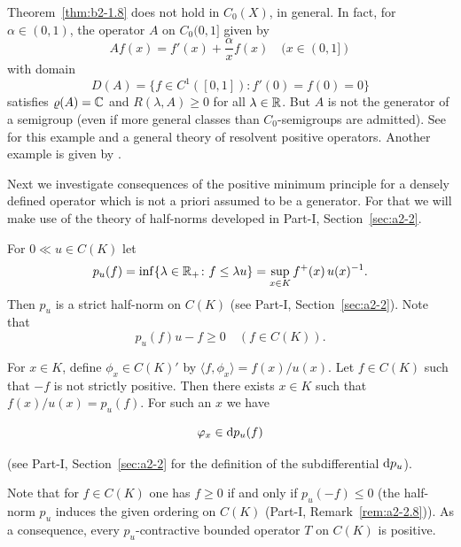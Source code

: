 \begin{remark*}\label{rem:b2-1.9-kgk2}
Theorem~\ref{thm:b2-1.8} does not hold in $C_{0}(X)$, in general.
In fact, for $\alpha \in (0,1)$,  the operator $A$ on $C_{0}(0,1]$ given by 
\[
    Af(x) = f'(x) + \frac{\alpha}{x} f(x) \quad (x \in (0,1])
\]
with domain 
\[
D(A) = \{f \in C^{1}([0,1]) \colon f'(0) = f(0) = 0\} 
\]
satisfies $\rho(A) = \C $ and 
$R(\lambda,A) \geq 0$ for all $\lambda \in \mathbb{R}$.
But $A$ is not the generator of a semigroup (even if more general classes than $C_{0}$-semigroups are admitted).
See \textcite{arendt:1987} 
for this example and a general theory of resolvent positive operators.
Another example is given by \textcite{battydavies:1983}.
\end{remark*}

Next we investigate consequences of the positive minimum principle for a densely defined operator which is not a priori assumed to be a generator.
For that we will make use of the theory of half-norms developed in Part-I, Section~\ref{sec:a2-2}.

For $0 \ll u \in C(K)$ let
\begin{equation}\label{eq:b2-1.4}
p_{u}(f) = \inf\{\lambda \in \R_{+} \colon f \leq \lambda u\} = \sup_{x \in K} f^{+}(x)\,u(x)^{-1}.
\end{equation}
Then $p_{u}$ is a strict half-norm on $C(K)$ 
(see Part-I, Section~\ref{sec:a2-2}).
Note that
\begin{equation}\label{eq:b2-1.5}
p_{u}(f)u - f \geq 0 \quad (f \in C(K)).
\end{equation}

For $x \in K$, define $\phi_{x} \in C(K)'$ by $\langle f,\phi_{x} \rangle = f(x)/u(x)$.
Let $f \in C(K)$ such that $-f$ is not strictly positive.
Then there exists $x \in K$ such that $f(x)/u(x) = p_{u}(f)$.
For such an $x$ we have

\begin{equation}\label{eq:b2-1.6}
\phi_{x} \in \ddp_{u}(f)
\end{equation}


(see Part-I, Section~\ref{sec:a2-2} for the definition of the subdifferential $\mathop{}\!\mathrm{d}{p}_{u}$).

Note that for $f \in C(K)$ one has $f \geq 0$ if and only if\/ $p_{u}(-f) \leq 0$ (\ie  the half-norm $p_{u}$ induces the given ordering on $C(K)$ (\cf Part-I, Remark~\ref{rem:a2-2.8})).
As a consequence, every $p_{u}$-contractive bounded operator $T$ on $C(K)$ is positive.


